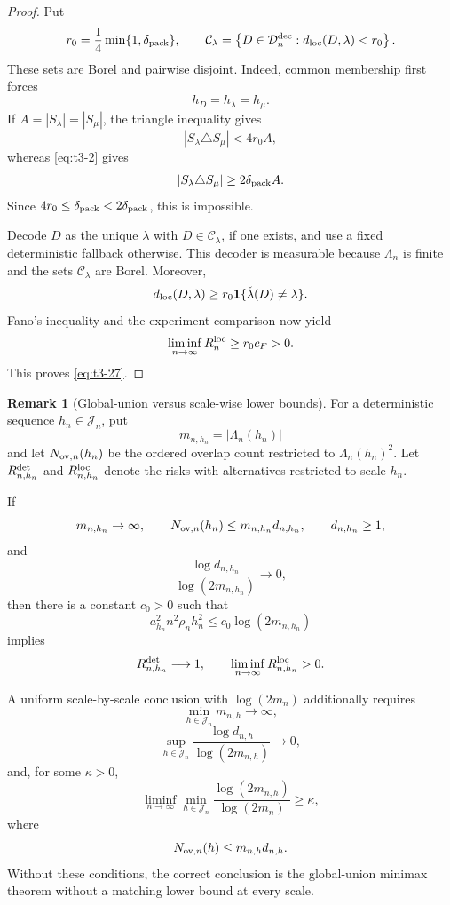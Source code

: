 \documentclass[11pt]{article}
\theoremstyle{definition}
\newtheorem{remark}[definition]{Remark}
\newcommand{\1}{\mathbf 1}\newcommand{\op}{\operatorname}
\begin{document}
\begin{proof}
Put
\[
r_0
=
\frac14\min\{1,\delta_{\rm pack}\},
\qquad
\mathcal C_\lambda
=
\left\{
D\in\mathcal D_n^{\rm dec}:
d_{\rm loc}(D,\lambda)<r_0
\right\}.
\]
These sets are Borel and pairwise disjoint.  Indeed, common membership
first forces
\[
h_D=h_\lambda=h_\mu.
\]
If \(A=|S_\lambda|=|S_\mu|\), the triangle inequality gives
\[
|S_\lambda\triangle S_\mu|<4r_0A,
\]
whereas \eqref{eq:t3-2} gives
\[
|S_\lambda\triangle S_\mu|
\ge2\delta_{\rm pack}A.
\]
Since \(4r_0\le\delta_{\rm pack}<2\delta_{\rm pack}\), this is
impossible.

Decode \(D\) as the unique \(\lambda\) with
\(D\in\mathcal C_\lambda\), if one exists, and use a fixed
deterministic fallback otherwise.  This decoder is measurable because
\(\Lambda_n\) is finite and the sets \(\mathcal C_\lambda\) are
Borel.  Moreover,
\[
d_{\rm loc}(D,\lambda)
\ge
r_0\mathbf 1\{\check\lambda(D)\ne\lambda\}.
\]
Fano's inequality and the experiment comparison now yield
\[
\liminf_{n\to\infty}R_n^{\rm loc}
\ge
r_0c_F>0.
\]
This proves \eqref{eq:t3-27}.
\end{proof}

\begin{remark}[Global-union versus scale-wise lower bounds]
For a deterministic sequence \(h_n\in\mathcal J_n\), put
\[
m_{n,h_n}=|\Lambda_n(h_n)|
\]
and let \(N_{{\rm ov},n}(h_n)\) be the ordered overlap count restricted
to \(\Lambda_n(h_n)^2\).  Let
\(R_{n,h_n}^{\rm det}\) and \(R_{n,h_n}^{\rm loc}\) denote the risks
with alternatives restricted to scale \(h_n\).

If
\[
m_{n,h_n}\to\infty,
\qquad
N_{{\rm ov},n}(h_n)
\le
m_{n,h_n}d_{n,h_n},
\qquad
d_{n,h_n}\ge1,
\]
and
\[
\frac{\log d_{n,h_n}}
{\log(2m_{n,h_n})}
\longrightarrow0,
\]
then there is a constant \(c_0>0\) such that
\[
a_{h_n}^2n^2\rho_nh_n^2
\le
c_0\log(2m_{n,h_n})
\]
implies
\[
R_{n,h_n}^{\rm det}\longrightarrow1,
\qquad
\liminf_{n\to\infty}R_{n,h_n}^{\rm loc}>0.
\]

A uniform scale-by-scale conclusion with \(\log(2m_n)\) additionally
requires
\[
\min_{h\in\mathcal J_n}m_{n,h}\longrightarrow\infty,
\]
\[
\sup_{h\in\mathcal J_n}
\frac{\log d_{n,h}}
{\log(2m_{n,h})}
\longrightarrow0,
\]
and, for some \(\kappa>0\),
\[
\liminf_{n\to\infty}
\min_{h\in\mathcal J_n}
\frac{\log(2m_{n,h})}{\log(2m_n)}
\ge\kappa,
\]
where
\[
N_{{\rm ov},n}(h)
\le
m_{n,h}d_{n,h}.
\]
Without these conditions, the correct conclusion is the global-union
minimax theorem without a matching lower bound at every scale.
\end{remark}
\end{document}
